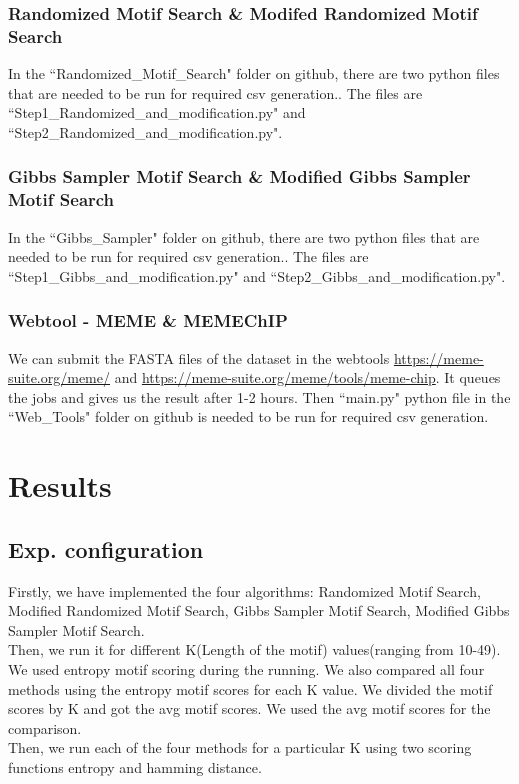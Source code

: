 \documentclass{article}
\begin{document}
\subsubsection{Randomized Motif Search \& Modifed Randomized Motif Search}
In the ``Randomized\_Motif\_Search" folder on github, there are two python files that are needed to be run for required csv generation.. The files are ``Step1\_Randomized\_and\_modification.py" and ``Step2\_Randomized\_and\_modification.py".
\subsubsection{Gibbs Sampler Motif Search \& Modified Gibbs Sampler Motif Search}
In the ``Gibbs\_Sampler" folder on github, there are two python files that are needed to be run for required csv generation.. The files are ``Step1\_Gibbs\_and\_modification.py" and ``Step2\_Gibbs\_and\_modification.py".
\subsubsection{Webtool\cite{gkv416} - MEME \& MEMEChIP}
We can submit the FASTA files of the dataset in the webtools \url{https://meme-suite.org/meme/} and \url{https://meme-suite.org/meme/tools/meme-chip}. It queues the jobs and gives us the result after 1-2 hours. Then ``main.py" python file in the ``Web\_Tools" folder on github is needed to be run for required csv generation.
\section{Results}
\subsection{Exp. configuration}
Firstly, we have implemented the four algorithms: Randomized Motif Search, Modified Randomized Motif Search, Gibbs Sampler Motif Search, Modified Gibbs Sampler Motif Search.\\

Then, we run it for different K(Length of the motif) values(ranging from 10-49). We used entropy motif scoring during the running. We also compared all four methods using the entropy motif scores for each K value. We divided the motif scores by K and got the avg motif scores. We used the avg motif scores for the comparison.\\

Then, we run each of the four methods for a particular K using two scoring functions entropy and hamming distance.\\
\end{document}
